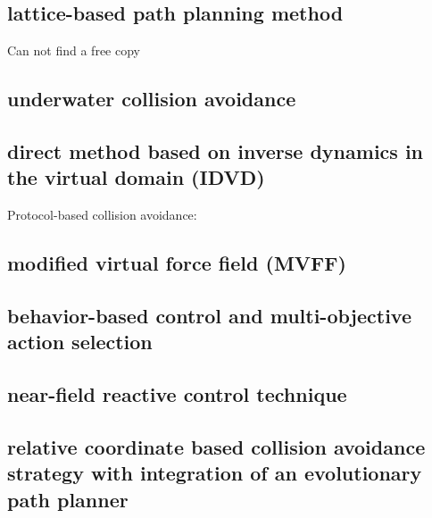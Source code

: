 \subsection{lattice-based path planning method }\cite{bertaska2013experimental}
\begin{itemize}
    \con Can not find a free copy
\end{itemize}
\subsection{underwater collision avoidance}\cite{heidarsson2011obstacle,onunka2013probabilistic}

\subsection{direct method based on inverse dynamics in the virtual domain (IDVD) }\cite{yakimenko2011real}


Protocol-based collision avoidance:
\subsection{modified virtual force field (MVFF) }\cite{lee2004fuzzy}

\subsection{behavior-based control and multi-objective action selection} \cite{benjamin2004colregs,benjamin2006method}

\subsection{near-field reactive control technique }\cite{larson2007advances}

\subsection{relative coordinate based collision avoidance strategy with integration of an evolutionary path planner }\cite{zhuang2011motion}


